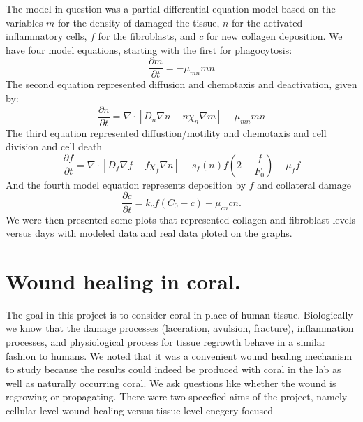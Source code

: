 \documentclass[12pt]{amsart}
\begin{document}
\begin{onehalfspace}
        The model in question was a partial differential equation model based on the variables
        $m$ for the density of damaged the tissue, $n$ for the activated inflammatory cells, $f$ for the
        fibroblasts, and $c$ for new collagen deposition.
        We have four model equations, starting with the first for phagocytosis:
        \begin{displaymath}
            \frac{\partial m}{\partial t} = -\mu_{mn} mn
        \end{displaymath}
        The second equation represented diffusion and chemotaxis and deactivation, given by:
        \begin{displaymath}
            \frac{\partial n}{\partial t} = \nabla \cdot\left[D_n \nabla n - n \chi_n\nabla m\right] - \mu_{mn}mn
        \end{displaymath}
        The third equation represented diffustion/motility and chemotaxis and cell division and cell death
        \begin{displaymath}
            \frac{\partial f}{\partial t} = \nabla \cdot\left[D_f\nabla f - f\chi_f\nabla n\right] + s_f(n)f\left(2 - \frac{f}{F_0}\right) - \mu_f f
        \end{displaymath}
        And the fourth model equation represents deposition by $f$ and collateral damage
        \begin{displaymath}
            \frac{\partial c}{\partial t} = k_c f(C_0 - c) - \mu_{cn}cn.
        \end{displaymath}
        We were then presented some plots that represented collagen and fibroblast levels versus days
        with modeled data and real data ploted on the graphs.

        \section{Wound healing in coral.}
        The goal in this project is to consider coral in place of human tissue.
        Biologically we know that the damage processes (laceration, avulsion, fracture),
        inflammation processes, and physiological process for tissue regrowth behave in
        a similar fashion to humans.
        We noted that it was a convenient wound healing mechanism to study because the results
        could indeed be produced with coral in the lab as well as naturally occurring coral.
        We ask questions like whether the wound is regrowing or propagating.
        There were two specefied aims of the project, namely cellular level-wound healing
        versus tissue level-enegery focused


\end{onehalfspace}
\end{document}
